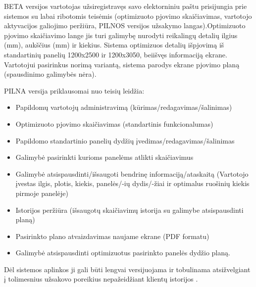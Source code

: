 \documentclass[a4paper,12pt]{article}
\begin{document}
	\vspace{-5mm}
	BETA versijos vartotojas užsiregistravęs savo elektorniniu paštu prisijungia prie sistemos su labai ribotomis teisėmis (optimizuoto pjovimo skaičiavimas, vartotojo aktyvacijos galiojimo peržiūra, PILNOS versijos užsakymo langas).Optimizuoto pjovimo skaičiavimo lange jis turi galimybę nurodyti reikalingų detalių ilgius (mm), aukščius (mm) ir kiekius. Sistema optimizuos detalių išpjovimą iš standartinių panelių 1200x2500 ir 1200x3050, beiišvęs informaciją ekrane.  Vartotojui pasirinkus norimą variantą, sistema parodys ekrane pjovimo planą (spausdinimo galimybės nėra). 
\begin{center}
	PILNA versija priklausomai nuo teisių leidžia:
	\begin{itemize}
		\item Papildomų vartotojų administravimą (kūrimas/redagavimas/šalinimas)
		\item Optimizuoto pjovimo skaičiavimas (standartinis funkcionalumas)
		\item Papildomo standartinio panelių dydžių įvedimas/redagavimas/šalinimas
		\item Galimybė pasirinkti kurioms panelėms atlikti skaičiavimus
		\item Galimybė atsispausdinti/išsaugoti bendrinę informaciją/ataskaitą (Vartotojo  įvestas ilgis, plotis, kiekis, panelės/-ių dydis/-žiai ir optimalus ruošinių kiekis pirmoje panelėje)
		\item Istorijos peržiūra (išsaugotų skaičiavimų istorija su galimybe atsispausdinti planą)
		\item Pasirinkto plano atvaizdavimas naujame ekrane (PDF formatu)
		\item Galimybė atsispausdinti optimizuotus pasirinkto panelės dydžio planą.
	\end{itemize}
	Dėl sistemos aplinkos ji gali būti lengvai versijuojama ir tobulinama atsižvelgiant į tolimesnius užsakovo poreikius nepažeidžiant klientų istorijos .
\end{center}
	
\end{document}
